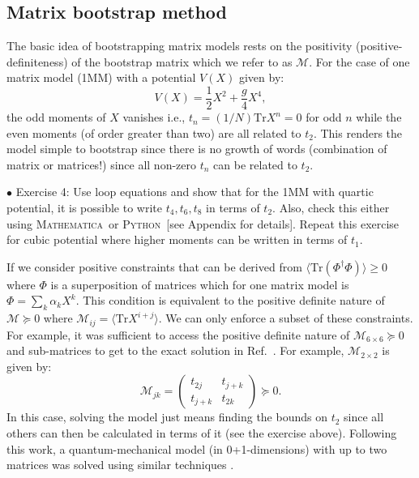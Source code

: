 \documentclass[letter,11pt]{article}
\newcommand{\MA}{\textsc{Mathematica}}
\newcommand{\PY}{\textsc{Python}}
\begin{document}
\subsection{Matrix bootstrap method}
The basic idea of bootstrapping matrix models rests on the 
positivity (positive-definiteness) of the bootstrap matrix which we refer to as $\mathcal{M}$. 
For the case of one matrix model (1MM) with a potential $V(X)$ given by: 
\begin{equation}
    V(X) = \frac12 X^2 + \frac{g}{4} X^4, 
\end{equation}
the odd moments of $X$ vanishes i.e., $ t_{n} = (1/N)\mbox{Tr} X^n = 0$ for odd $n$
while the even moments (of order greater than two) are all related to $t_{2}$. This renders the 
model simple to bootstrap since there is no growth of words (combination of matrix or matrices!)
since all non-zero $t_{n}$ can be related to $t_{2}$. 
\begin{mdframed}[backgroundcolor=blue!3] 
	$\bullet$ Exercise 4: Use loop equations and show that for the 1MM with quartic potential, it is possible to write $t_{4}, t_{6}, t_{8}$ in terms of $t_{2}$. Also, check this either using \MA~or  \PY~[see Appendix for details]. 
Repeat this exercise for cubic potential where higher moments can be written in terms of $t_1$.  
\end{mdframed} 
If we consider positive constraints that can be derived from $\langle \mbox{Tr}(\Phi^{\dagger}\Phi) \rangle \ge 0 $
where $\Phi$ is a superposition of matrices which for one matrix model is 
$ \Phi = \sum_{k} \alpha_{k} X^{k}$. This condition is equivalent to the positive definite nature of
$\mathcal{M} \succeq 0 $ where $ \mathcal{M}_{ij} = \langle \mbox{Tr} X^{i+j} \rangle$. 
We can only enforce a subset of these constraints. For example, it was sufficient to 
access the positive definite nature of $\mathcal{M}_{6 \times 6} \succeq 0 $ 
and sub-matrices to get to the exact solution in Ref.~\cite{Lin:2020mme}. 
For example, $\mathcal{M}_{2 \times 2}$ is given by:
\begin{equation}
	\mathcal{M}_{jk} = 
	\begin{pmatrix}
		t_{2j} & t_{j+k}  \\
		t_{j+k} & t_{2k}  
	\end{pmatrix}  \succeq 0. 
\end{equation}
In this case, solving the model just means finding the bounds on $t_{2}$ 
since all others can then be calculated in terms of it (see the exercise above). 
Following this work, a quantum-mechanical 
model (in 0+1-dimensions) with up to two matrices was solved using similar techniques \cite{Han:2020bkb}.  
\end{document}
